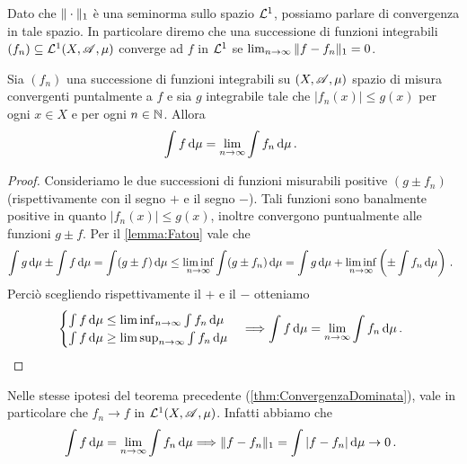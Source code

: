\begin{remark}
	Dato che $\Vert \cdot\Vert_1$ è una seminorma sullo spazio $\mathcal L^1$, possiamo parlare di convergenza in tale spazio. In particolare diremo che una successione di funzioni integrabili $(f_n)\subseteq \mathcal L^1(X,\mathscr A,\mu)$ converge ad $f$ in $\mathcal L^1$ se $\lim_{n\to\infty}\Vert f-f_n\Vert_1=0$.
\end{remark}

\begin{theorem}\label{thm:ConvergenzaDominata}
	Sia $(f_n)$ una successione di funzioni integrabili su $(X,\mathscr A,\mu)$ spazio di misura convergenti puntalmente a $f$ e sia $g$ integrabile tale che $|f_n(x)|\le g(x)$ per ogni $x\in X$ e per ogni $n\in\mathbb N$. Allora
	\begin{equation*}
		\int f \,\mathrm d\mu=\lim_{n\to\infty}\int f_n\,\mathrm d\mu\, \text{. }
	\end{equation*}
\end{theorem}
\begin{proof}
	Consideriamo le due successioni di funzioni misurabili positive $(g\pm f_n)$ (rispettivamente con il segno $+$ e il segno $-$). Tali funzioni sono banalmente positive in quanto $|f_n(x)|\le g(x)$, inoltre convergono puntualmente alle funzioni $g\pm f$. Per il \cref{lemma:Fatou} vale che
	\begin{equation*}
		\int g\,\mathrm d\mu\pm\int f\,\mathrm d\mu=\int (g\pm f) \,\mathrm d\mu \le \liminf_{n\to\infty} \int (g\pm f_n) \,\mathrm d\mu=\int g\,\mathrm d\mu +\liminf_{n\to\infty}\left( \pm\int f_n \,\mathrm d \mu\right)\, \text{. }
	\end{equation*}
	Perciò scegliendo rispettivamente il $+$ e il $-$ otteniamo
	\begin{equation*}
		\begin{cases}
			\int f \,\mathrm d\mu\le \liminf_{n\to\infty}\int f_n \,\mathrm d \mu \\
			\int f\,\mathrm d\mu \ge \limsup_{n\to\infty}\int f_n \,\mathrm d \mu
		\end{cases}
		\Longrightarrow \int f\,\mathrm d\mu = \lim_{n\to\infty}\int f_n \,\mathrm d \mu\, \text{. }
	\end{equation*}
\end{proof}

\begin{remark}\label{nota:ConvergenzaL1Dominata}
	Nelle stesse ipotesi del teorema precedente (\cref{thm:ConvergenzaDominata}), vale in particolare che $f_n\to f$ in $\mathcal L^1(X,\mathscr A,\mu)$. Infatti abbiamo che
	\begin{equation*}
		\int f \,\mathrm d\mu=\lim_{n\to\infty}\int f_n\,\mathrm d\mu \Longrightarrow \Vert f-f_n\Vert_1=\int |f-f_n|\,\mathrm d\mu\to 0\, \text{. }
	\end{equation*}
\end{remark}

